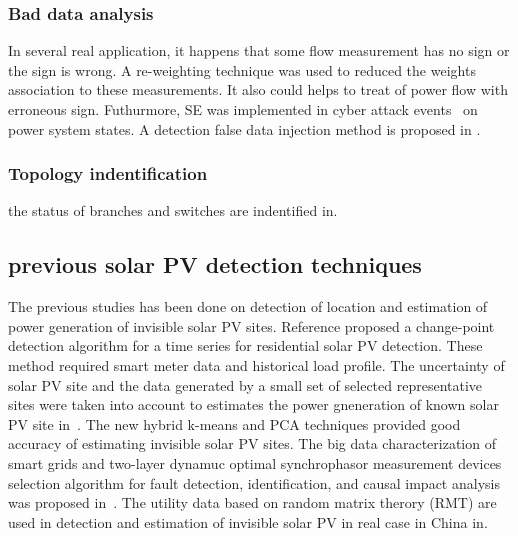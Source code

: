 \subsubsection{Bad data analysis}

In several real application, it happens that some flow measurement has no sign or the sign is wrong.
A re-weighting technique was used to reduced the weights association to these measurements\cite{b6}.
It also could helps to treat of power flow with erroneous sign.
Futhurmore, SE was implemented in cyber attack events~\cite{b10} on power system states. A detection false data injection method is proposed in \cite{b8}.

\subsubsection{Topology indentification}

the status of branches and switches are indentified in\cite{b6}.


\subsection{previous solar PV detection techniques}
The previous studies has been done on detection of location and estimation of power generation of invisible solar PV sites.
Reference \cite{b11} proposed a change-point detection algorithm for a time series for residential solar PV detection. These method required smart meter data and historical load profile.
The uncertainty of solar PV site and the data generated by a small set of selected representative sites were taken into account to estimates the power gneneration of known solar PV site in~\cite{b12}.  The new hybrid k-means and PCA techniques provided good accuracy of estimating invisible solar PV sites.
The big data characterization of smart grids and two-layer dynamuc optimal synchrophasor measurement devices selection algorithm for fault detection, identification, and causal impact analysis was proposed in~\cite{b13}.
The utility data based on random matrix therory (RMT) are used in detection and estimation of invisible solar PV in real case in China in\cite{b14}.

